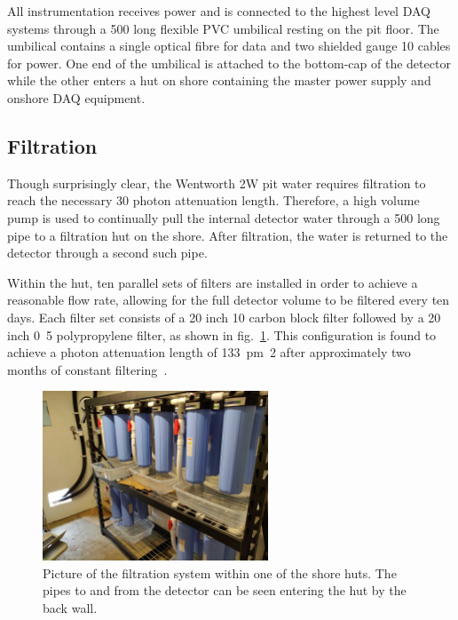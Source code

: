 All \chipsfive instrumentation receives power and is connected to the highest level DAQ systems
through a \unit{500}{} long flexible PVC umbilical resting on the pit floor. The umbilical
contains a single optical fibre for data and two shielded gauge 10 cables for power. One end of
the umbilical is attached to the bottom-cap of the detector while the other enters a hut on shore
containing the master power supply and onshore DAQ equipment.

\subsection{Filtration} %
\label{sec:chips_detector_water} %

Though surprisingly clear, the Wentworth 2W pit water requires filtration to reach the necessary
\unit{30}{} photon attenuation length. Therefore, a high volume pump is used to
continually pull the internal detector water through a \unit{500}{} long pipe to a
filtration hut on the shore. After filtration, the water is returned to the detector through a
second such pipe.

Within the hut, ten parallel sets of filters are installed in order to achieve a reasonable flow
rate, allowing for the full detector volume to be filtered every ten days. Each filter set
consists of a 20 inch \unit{10}{\micro{}} carbon block filter followed by a 20 inch
\unit{0.5}{\micro{}} polypropylene filter, as shown in fig.~\ref{fig:filtration}. This
configuration is found to achieve a photon attenuation length of \unit{133\pm2}{} after
approximately two months of constant filtering~\cite{campbell2020}.

\begin{figure} %
    \includegraphics[width=0.6\textwidth]{diagrams/4-chips/filtration.pdf}
    \caption[Picture of the \chipsfive filtration system]
    {Picture of the \chipsfive filtration system within one of the shore huts. The pipes to and
        from the detector can be seen entering the hut by the back wall.}
    \label{fig:filtration}
\end{figure}

